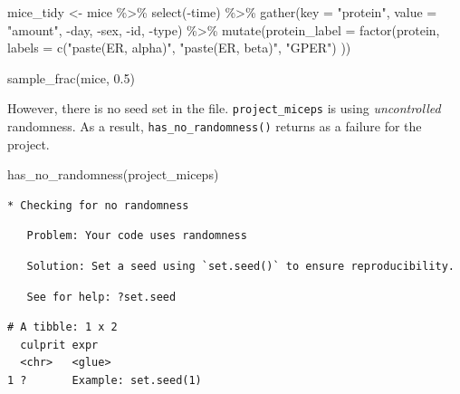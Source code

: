 \documentclass[12pt,twoside]{reedthesis}
\newenvironment{Shaded}{\begin{snugshade}}{\end{snugshade}}
\newcommand{\AttributeTok}[1]{\textcolor[rgb]{0.77,0.63,0.00}{#1}}
\newcommand{\FloatTok}[1]{\textcolor[rgb]{0.00,0.00,0.81}{#1}}
\newcommand{\FunctionTok}[1]{\textcolor[rgb]{0.00,0.00,0.00}{#1}}
\newcommand{\NormalTok}[1]{#1}
\newcommand{\OtherTok}[1]{\textcolor[rgb]{0.56,0.35,0.01}{#1}}
\newcommand{\SpecialCharTok}[1]{\textcolor[rgb]{0.00,0.00,0.00}{#1}}
\newcommand{\StringTok}[1]{\textcolor[rgb]{0.31,0.60,0.02}{#1}}
\begin{document}
\begin{Shaded}
\begin{Highlighting}[]
\NormalTok{mice\_tidy }\OtherTok{\textless{}{-}}\NormalTok{ mice }\SpecialCharTok{\%\textgreater{}\%}
  \FunctionTok{select}\NormalTok{(}\SpecialCharTok{{-}}\NormalTok{time) }\SpecialCharTok{\%\textgreater{}\%}
  \FunctionTok{gather}\NormalTok{(}\AttributeTok{key =} \StringTok{"protein"}\NormalTok{, }\AttributeTok{value =} \StringTok{"amount"}\NormalTok{, }\SpecialCharTok{{-}}\NormalTok{day, }\SpecialCharTok{{-}}\NormalTok{sex, }\SpecialCharTok{{-}}\NormalTok{id, }\SpecialCharTok{{-}}\NormalTok{type) }\SpecialCharTok{\%\textgreater{}\%}
  \FunctionTok{mutate}\NormalTok{(}\AttributeTok{protein\_label =} \FunctionTok{factor}\NormalTok{(protein,}
    \AttributeTok{labels =} \FunctionTok{c}\NormalTok{(}\StringTok{"paste(ER, alpha)"}\NormalTok{, }\StringTok{"paste(ER, beta)"}\NormalTok{, }\StringTok{"GPER"}\NormalTok{)}
\NormalTok{  ))}
\end{Highlighting}
\end{Shaded}
\begin{Shaded}
\begin{Highlighting}[]
\FunctionTok{sample\_frac}\NormalTok{(mice, }\FloatTok{0.5}\NormalTok{)}
\end{Highlighting}
\end{Shaded}
However, there is no seed set in the file. \texttt{project\_miceps} is using \emph{uncontrolled} randomness. As a result, \texttt{has\_no\_randomness()} returns as a failure for the project.
\begin{Shaded}
\begin{Highlighting}[]
\FunctionTok{has\_no\_randomness}\NormalTok{(}\StringTok{\textquotesingle{}project\_miceps\textquotesingle{}}\NormalTok{)}
\end{Highlighting}
\end{Shaded}
\begin{verbatim}
* Checking for no randomness
\end{verbatim}
\begin{verbatim}
   Problem: Your code uses randomness
\end{verbatim}
\begin{verbatim}
   Solution: Set a seed using `set.seed()` to ensure reproducibility.
\end{verbatim}
\begin{verbatim}
   See for help: ?set.seed
\end{verbatim}
\begin{verbatim}
# A tibble: 1 x 2
  culprit expr                
  <chr>   <glue>              
1 ?       Example: set.seed(1)
\end{verbatim}
\end{document}

